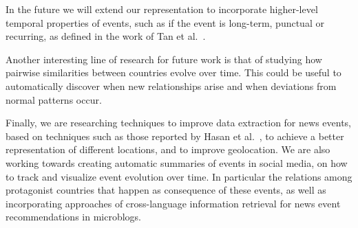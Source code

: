 In the future we will extend our representation to incorporate higher-level
temporal properties of events, such as if the event is long-term, punctual or
recurring, as defined in the work of Tan et al.~\cite{st-model_2009}.
%

Another interesting line of research for future work is that of studying how
pairwise similarities between countries evolve over time. 
%
This could be useful to automatically discover when new relationships arise and
when deviations from normal patterns occur.

Finally, we are researching techniques to improve data extraction for news
events, based on techniques such as those reported by Hasan et
al.~\cite{doi:10.1177/0165551517698564}, to achieve a better representation of
different locations, and to improve geolocation. 
%
We are also working towards creating automatic summaries of events in social
media, on how to track and visualize event evolution over time. 
%
In particular the relations among protagonist countries that happen as
consequence of these events, as well as incorporating approaches of
cross-language information retrieval\cite{grefenstette2012cross} for news event
recommendations in microblogs.